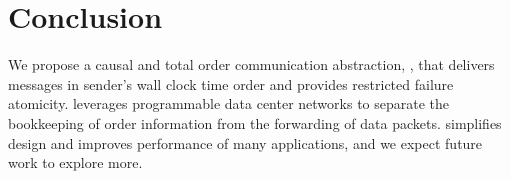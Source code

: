 \section{Conclusion}
\label{sec:conclusion}

We propose a causal and total order communication abstraction, \sys{}, that delivers messages in sender's wall clock time order and provides restricted failure atomicity. 
\sys{} leverages programmable data center networks to separate the bookkeeping of order information from the forwarding of data packets.
\sys{} simplifies design and improves performance of many applications, and we expect future work to explore more. %

